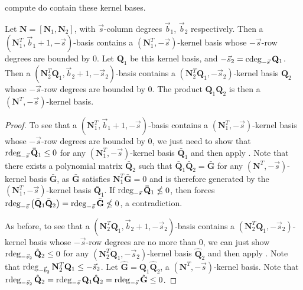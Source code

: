 compute do contain these kernel bases.
\begin{lem}
\label{lem:nullspaceBasisOfSubsetOfRowsContainedInOrderBasis}Let
$\mathbf{N}=\left[\mathbf{N}_{1},\mathbf{N}_{2}\right]$, with $\vec{s}$-column
degrees $\vec{b}_{1}$, $\vec{b}_{2}$ respectively. Then a $\left(\mathbf{N}_{1}^{T},\vec{b}_{1}+1,-\vec{s}\right)$-basis
contains a $\left(\mathbf{N}_{1}^{T},-\vec{s}\right)$-kernel basis
whose $-\vec{s}$-row degrees are bounded by 0. Let $\mathbf{Q}_{1}$
be this kernel basis, and $-\vec{s}_{2}=\cdeg_{-\vec{s}}\mathbf{Q}_{1}$.
Then a $\left(\mathbf{N}_{2}^{T}\mathbf{Q}_{1},\vec{b}_{2}+1,-\vec{s}_{2}\right)$-basis
contains a $\left(\mathbf{N}_{2}^{T}\mathbf{Q}_{1},-\vec{s}_{2}\right)$-kernel
basis $\mathbf{Q}_{2}$ whose $-\vec{s}$-row degrees are bounded
by 0. The product $\mathbf{Q}_{1}\mathbf{Q}_{2}$ is then a $\left(\mathbf{N}^{T},-\vec{s}\right)$-kernel
basis.\end{lem}
\begin{proof}
To see that a $\left(\mathbf{N}_{1}^{T},\vec{b}_{1}+1,-\vec{s}\right)$-basis
contains a $\left(\mathbf{N}_{1}^{T},-\vec{s}\right)$-kernel basis
whose $-\vec{s}$-row degrees are bounded by 0, we just need to show
that $\rdeg_{-\vec{s}}\mathbf{\bar{Q}}_{1}\le0$ for any $\left(\mathbf{N}_{1}^{T},-\vec{s}\right)$-kernel
basis $\mathbf{\bar{Q}}_{1}$ and then apply .
Note that there exists a polynomial matrix $\bar{\mathbf{Q}}_{2}$
such that $\mathbf{\bar{Q}}_{1}\mathbf{\bar{Q}}_{2}=\bar{\mathbf{G}}$
for any $\left(\mathbf{N}^{T},-\vec{s}\right)$-kernel basis $\bar{\mathbf{G}}$,
as $\bar{\mathbf{G}}$ satisfies $\mathbf{N}_{1}^{T}\bar{\mathbf{G}}=0$
and is therefore generated by the $\left(\mathbf{N}_{1}^{T},-\vec{s}\right)$-kernel
basis $\bar{\mathbf{Q}}_{1}$. If $\rdeg_{-\vec{s}}\mathbf{\bar{Q}}_{1}\nleq0$,
then  forces $\rdeg_{-\vec{s}}\left(\bar{\mathbf{Q}}_{1}\bar{\mathbf{Q}}_{2}\right)=\rdeg_{-\vec{s}}\bar{\mathbf{G}}\nleq0$,
a contradiction. 

As before, to see that a $\left(\mathbf{N}_{2}^{T}\mathbf{Q}_{1},\vec{b}_{2}+1,-\vec{s}_{2}\right)$-basis
contains a $\left(\mathbf{N}_{2}^{T}\mathbf{Q}_{1},-\vec{s}_{2}\right)$-kernel
basis whose $-\vec{s}$-row degrees are no more than 0, we can just
show $\rdeg_{-\vec{s}_{2}}\hat{\mathbf{Q}}_{2}\le0$ for any $\left(\mathbf{N}_{2}^{T}\mathbf{Q}_{1},-\vec{s}_{2}\right)$-kernel
basis $\hat{\mathbf{Q}}_{2}$ and then apply .
Note that $\rdeg_{-\vec{b}_{2}}\mathbf{N}_{2}^{T}\mathbf{Q}_{1}\le-\vec{s}_{2}$.
Let $\hat{\mathbf{G}}=\mathbf{Q}_{1}\hat{\mathbf{Q}}_{2}$, a $\left(\mathbf{N}^{T},-\vec{s}\right)$-kernel
basis. Note that $\rdeg_{-\vec{s}_{2}}\hat{\mathbf{Q}}_{2}=\rdeg_{-\vec{s}}\mathbf{Q}_{1}\hat{\mathbf{Q}}_{2}=\rdeg_{-\vec{s}}\hat{\mathbf{G}}\le0$. 
\end{proof}
